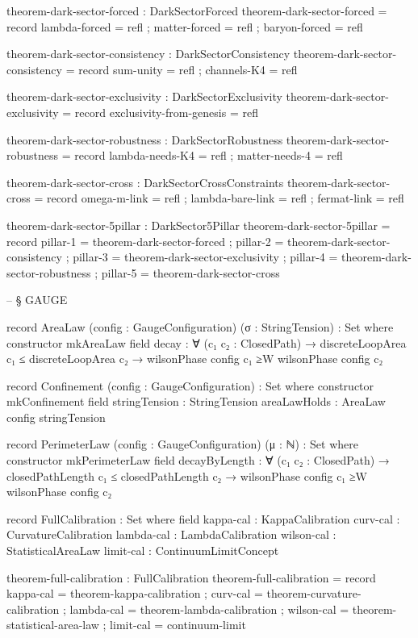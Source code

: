 \documentclass[11pt,a4paper]{book}
\begin{document}
\begin{code}
  theorem-dark-sector-forced : DarkSectorForced
  theorem-dark-sector-forced = record
    { lambda-forced = refl
    ; matter-forced = refl
    ; baryon-forced = refl
    }
  
  theorem-dark-sector-consistency : DarkSectorConsistency
  theorem-dark-sector-consistency = record
    { sum-unity   = refl
    ; channels-K4 = refl
    }
  
  theorem-dark-sector-exclusivity : DarkSectorExclusivity
  theorem-dark-sector-exclusivity = record
    { exclusivity-from-genesis = refl
    }
  
  theorem-dark-sector-robustness : DarkSectorRobustness
  theorem-dark-sector-robustness = record
    { lambda-needs-K4 = refl
    ; matter-needs-4  = refl
    }
  
  theorem-dark-sector-cross : DarkSectorCrossConstraints
  theorem-dark-sector-cross = record
    { omega-m-link     = refl
    ; lambda-bare-link = refl
    ; fermat-link      = refl
    }
  
  theorem-dark-sector-5pillar : DarkSector5Pillar
  theorem-dark-sector-5pillar = record
    { pillar-1 = theorem-dark-sector-forced
    ; pillar-2 = theorem-dark-sector-consistency
    ; pillar-3 = theorem-dark-sector-exclusivity
    ; pillar-4 = theorem-dark-sector-robustness
    ; pillar-5 = theorem-dark-sector-cross
    }


-- § GAUGE

record AreaLaw (config : GaugeConfiguration) (σ : StringTension) : Set where
  constructor mkAreaLaw
  field
    decay : ∀ (c₁ c₂ : ClosedPath) →
            discreteLoopArea c₁ ≤ discreteLoopArea c₂ →
            wilsonPhase config c₁ ≥W wilsonPhase config c₂

record Confinement (config : GaugeConfiguration) : Set where
  constructor mkConfinement
  field
    stringTension : StringTension
    areaLawHolds  : AreaLaw config stringTension

record PerimeterLaw (config : GaugeConfiguration) (μ : ℕ) : Set where
  constructor mkPerimeterLaw
  field
    decayByLength : ∀ (c₁ c₂ : ClosedPath) →
                    closedPathLength c₁ ≤ closedPathLength c₂ →
                    wilsonPhase config c₁ ≥W wilsonPhase config c₂

record FullCalibration : Set where
  field
    kappa-cal   : KappaCalibration
    curv-cal    : CurvatureCalibration
    lambda-cal  : LambdaCalibration
    wilson-cal  : StatisticalAreaLaw
    limit-cal   : ContinuumLimitConcept

theorem-full-calibration : FullCalibration
theorem-full-calibration = record
  { kappa-cal   = theorem-kappa-calibration
  ; curv-cal    = theorem-curvature-calibration
  ; lambda-cal  = theorem-lambda-calibration
  ; wilson-cal  = theorem-statistical-area-law
  ; limit-cal   = continuum-limit
  }


\end{code}
\end{document}
